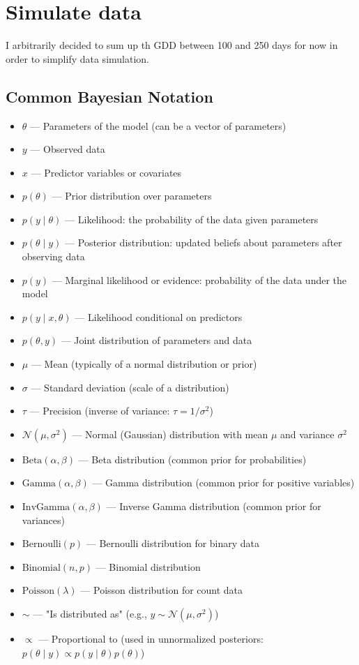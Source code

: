 \documentclass[a4paper,12pt]{article}
\begin{document}
\section{Simulate data}
I arbitrarily decided to sum up th GDD between 100 and 250 days for now in order to simplify data simulation. 

\subsection*{Common Bayesian Notation} %

\begin{itemize}
  \item $\theta$ --- Parameters of the model (can be a vector of parameters)
  \item $y$ --- Observed data
  \item $x$ --- Predictor variables or covariates
  \item $p(\theta)$ --- Prior distribution over parameters
  \item $p(y \mid \theta)$ --- Likelihood: the probability of the data given parameters
  \item $p(\theta \mid y)$ --- Posterior distribution: updated beliefs about parameters after observing data
  \item $p(y)$ --- Marginal likelihood or evidence: probability of the data under the model
  \item $p(y \mid x, \theta)$ --- Likelihood conditional on predictors
  \item $p(\theta, y)$ --- Joint distribution of parameters and data
  \item $\mu$ --- Mean (typically of a normal distribution or prior)
  \item $\sigma$ --- Standard deviation (scale of a distribution)
  \item $\tau$ --- Precision (inverse of variance: $\tau = 1/\sigma^2$)
  \item $\mathcal{N}(\mu, \sigma^2)$ --- Normal (Gaussian) distribution with mean $\mu$ and variance $\sigma^2$
  \item $\text{Beta}(\alpha, \beta)$ --- Beta distribution (common prior for probabilities)
  \item $\text{Gamma}(\alpha, \beta)$ --- Gamma distribution (common prior for positive variables)
  \item $\text{InvGamma}(\alpha, \beta)$ --- Inverse Gamma distribution (common prior for variances)
  \item $\text{Bernoulli}(p)$ --- Bernoulli distribution for binary data
  \item $\text{Binomial}(n, p)$ --- Binomial distribution
  \item $\text{Poisson}(\lambda)$ --- Poisson distribution for count data
  \item $\sim$ --- "Is distributed as" (e.g., $y \sim \mathcal{N}(\mu, \sigma^2)$)
  \item $\propto$ --- Proportional to (used in unnormalized posteriors: $p(\theta \mid y) \propto p(y \mid \theta) p(\theta)$)
\end{itemize}
\end{document}

